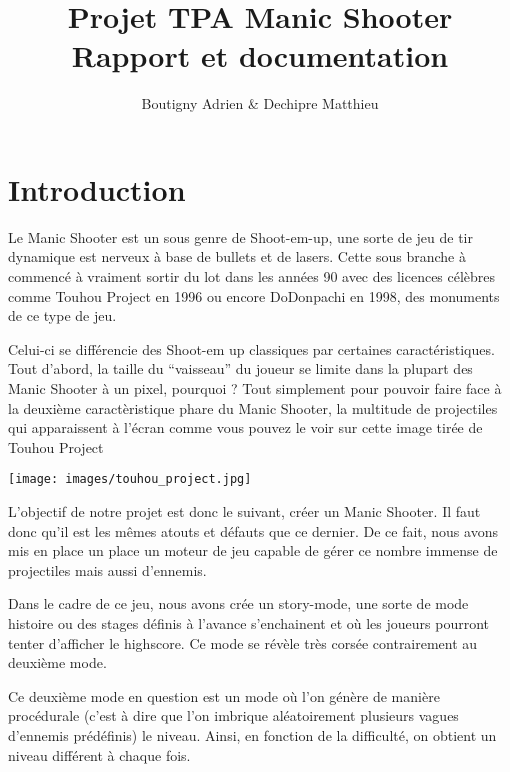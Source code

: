 \documentclass{article}
\begin{document}
\title{Projet TPA Manic Shooter \\ Rapport et documentation}
\author{Boutigny Adrien \& Dechipre Matthieu} %

\newpage

\tableofcontents

\newpage

\section{Introduction}

Le Manic Shooter est un sous genre de Shoot-em-up, une sorte de jeu de tir
dynamique est nerveux à base de bullets et de lasers. Cette sous branche à
commencé à vraiment sortir du lot dans les années 90 avec des licences célèbres
comme Touhou Project en 1996 ou encore DoDonpachi en 1998, des monuments de ce
type de jeu.

Celui-ci se différencie des Shoot-em up classiques par certaines
caractéristiques. Tout d'abord, la taille du ``vaisseau'' du joueur se limite dans
la plupart des Manic Shooter à un pixel, pourquoi ? Tout simplement pour pouvoir
faire face à la deuxième caractèristique phare du Manic Shooter, la multitude de
projectiles qui apparaissent à l'écran comme vous pouvez le voir sur cette image
tirée de Touhou Project

\begin{center}
\texttt{[image: images/touhou\_project.jpg]}
\end{center}

L'objectif de notre projet est donc le suivant, créer un Manic Shooter. Il faut
donc qu'il est les mêmes atouts et défauts que ce dernier. De ce fait, nous
avons mis en place un place un moteur de jeu capable de gérer ce nombre immense
de projectiles mais aussi d'ennemis.

Dans le cadre de ce jeu, nous avons crée un story-mode, une sorte de mode
histoire ou des stages définis à l'avance s'enchainent et où les joueurs
pourront tenter d'afficher le highscore. Ce mode se révèle très corsée
contrairement au deuxième mode.

Ce deuxième mode en question est un mode où l'on génère de manière procédurale
(c'est à dire que l'on imbrique aléatoirement plusieurs vagues d'ennemis
prédéfinis) le niveau. Ainsi, en fonction de la difficulté, on obtient un niveau
différent à chaque fois.
\end{document}

